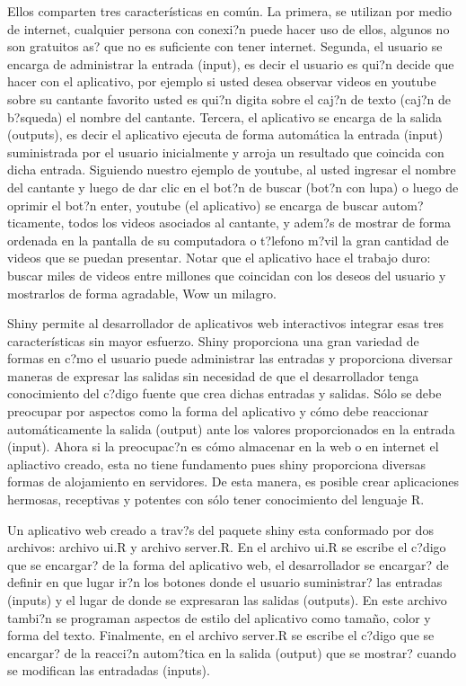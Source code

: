 \documentclass[]{comunicaciones}
\begin{document}
Ellos comparten tres características en común. La primera, se utilizan por medio de internet, cualquier persona con conexi?n puede hacer uso de ellos, algunos no son gratuitos as? que no es suficiente con tener internet. Segunda, el usuario se encarga de administrar la entrada (input), es decir el usuario es qui?n decide que hacer con el aplicativo, por ejemplo si usted desea observar videos en youtube sobre su cantante favorito usted es qui?n digita sobre el caj?n de texto (caj?n de b?squeda) el nombre del cantante. Tercera, el aplicativo se encarga de la salida (outputs), es decir el aplicativo ejecuta de forma automática la entrada (input) suministrada por el usuario inicialmente y arroja un resultado que coincida con dicha entrada. Siguiendo nuestro ejemplo de youtube, al usted ingresar el nombre del cantante y luego de dar clic en el bot?n de buscar (bot?n con lupa) o luego de oprimir el bot?n enter, youtube (el aplicativo) se encarga de buscar autom?ticamente, todos los videos asociados al cantante, y adem?s de mostrar de forma ordenada en la pantalla de su computadora o t?lefono m?vil la gran cantidad de videos que se puedan presentar. Notar que el aplicativo hace el trabajo duro: buscar miles de videos entre millones que coincidan con los deseos del usuario y mostrarlos de forma agradable, Wow un milagro.

Shiny permite al desarrollador de aplicativos web interactivos integrar esas tres características sin mayor esfuerzo. Shiny proporciona una gran variedad de formas en c?mo el usuario puede administrar las entradas y proporciona diversar maneras de expresar las salidas sin necesidad de que el desarrollador tenga conocimiento del c?digo fuente que crea dichas entradas y salidas. Sólo se debe preocupar por aspectos como la forma del aplicativo y cómo debe reaccionar automáticamente la salida (output) ante los valores proporcionados en la entrada (input). Ahora si la preocupac?n es cómo almacenar en la web o en internet el apliactivo creado, esta no tiene fundamento pues shiny proporciona diversas formas de alojamiento en servidores. De esta manera, es posible crear aplicaciones hermosas, receptivas y potentes con sólo tener conocimiento del lenguaje R.

Un aplicativo web creado a trav?s del paquete shiny esta conformado por dos archivos: archivo ui.R y archivo server.R. En el archivo ui.R se escribe el c?digo que se encargar? de la forma del aplicativo web, el desarrollador se encargar? de definir en que lugar ir?n los botones donde el usuario suministrar? las entradas (inputs) y el lugar de donde se expresaran las salidas (outputs). En este archivo tambi?n se programan aspectos de estilo del aplicativo como tamaño, color y forma del texto. Finalmente, en el archivo server.R se escribe el c?digo que se encargar? de la reacci?n autom?tica en la salida (output) que se mostrar? cuando se modifican las entradadas (inputs).
\end{document}
